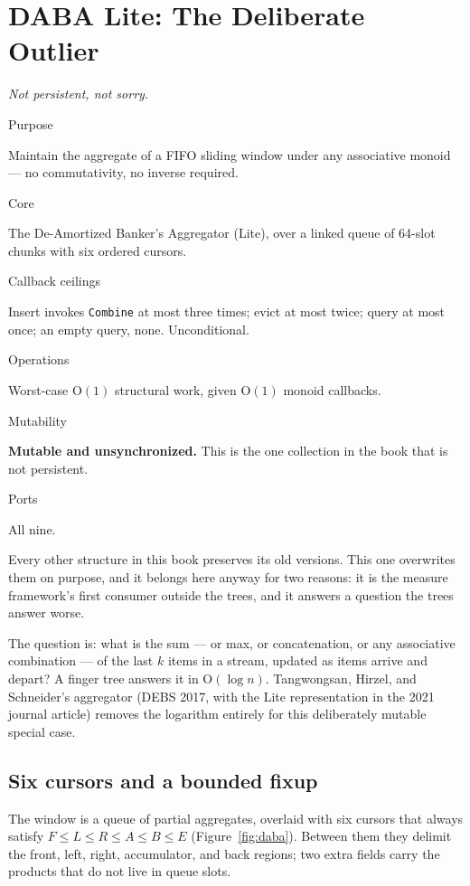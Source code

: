 \documentclass[11pt,twoside,openright]{book}
\newcommand{\code}[1]{\texorpdfstring{\textcolor{d7ink}{\texttt{#1}}}{#1}}
\newcommand{\bigoh}[1]{$\mathrm{O}(#1)$}
\newcommand{\motto}[1]{%
  \begingroup
  \vspace{-4pt}\hfill\begin{minipage}{0.80\textwidth}
    \raggedleft\itshape\color{d7slate}\small #1\par
  \end{minipage}\par\vspace{18pt}
  \endgroup}
\newcommand{\spec}[2]{%
  \par\noindent
  \parbox[t]{0.21\linewidth}{\raggedright\sffamily\bfseries\footnotesize
    \color{d7slate}\strut #1}%
  \hspace{9pt}%
  \parbox[t]{\dimexpr0.79\linewidth-9pt\relax}{\raggedright\strut #2}%
  \par\vspace{3.5pt}}
\newenvironment{specimen}[1][Specimen]
  {\begin{glancebox}[#1]\small\setlength{\parindent}{0pt}}
  {\end{glancebox}}
\begin{document}
\chapter{DABA Lite: The Deliberate Outlier}
\label{ch:daba}

\motto{Not persistent, not sorry.}

\begin{specimen}[Specimen --- \code{DabaLite}]
%
\spec{Purpose}{Maintain the aggregate of a FIFO sliding window under any associative monoid --- no commutativity, no inverse required.}
\spec{Core}{The De-Amortized Banker's Aggregator (Lite), over a linked queue of 64-slot chunks with six ordered cursors.}
\spec{Callback ceilings}{Insert invokes \code{Combine} at most three times; evict at most twice; query at most once; an empty query, none. Unconditional.}
\spec{Operations}{Worst-case \bigoh{1} structural work, given \bigoh{1} monoid callbacks.}
\spec{Mutability}{\textbf{Mutable and unsynchronized.} This is the one collection in the book that is not persistent.}
\spec{Ports}{All nine.}
\end{specimen}

\noindent
Every other structure in this book preserves its old versions. This one
overwrites them on purpose, and it belongs here anyway for two reasons: it is the
measure framework's first consumer outside the trees, and it answers a question
the trees answer worse.

The question is: what is the sum --- or max, or concatenation, or any associative
combination --- of the last $k$ items in a stream, updated as items arrive and
depart? A finger tree answers it in \bigoh{\log n}. Tangwongsan, Hirzel, and
Schneider's aggregator (DEBS 2017, with the Lite representation in the 2021
journal article) removes the logarithm entirely for this deliberately mutable
special case.

\section{Six cursors and a bounded fixup}

The window is a queue of partial aggregates, overlaid with six cursors that
always satisfy $F \leq L \leq R \leq A \leq B \leq E$
(Figure~\ref{fig:daba}). Between them they delimit the front, left, right,
accumulator, and back regions; two extra fields carry the products that do not
live in queue slots.
\end{document}
